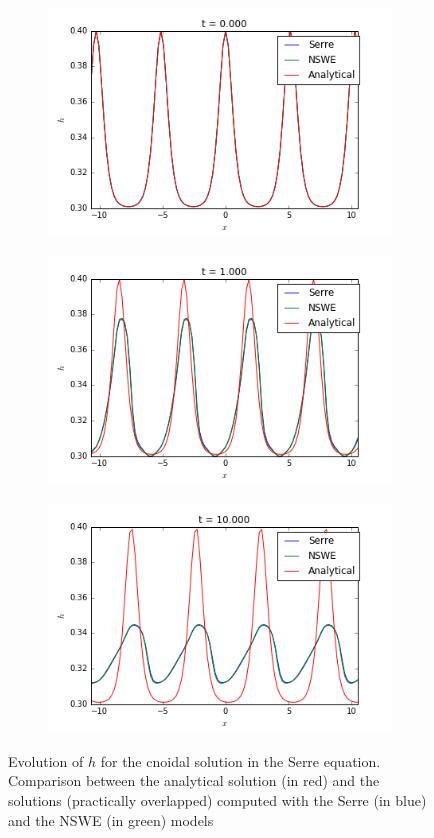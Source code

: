 \begin{figure}[h!]
	\begin{subfigure}{.3\linewidth}
		\includegraphics[scale=.3]{figures/Serre/cnoidal1h.png}	
	\end{subfigure}
	\begin{subfigure}{.3\linewidth}
		\includegraphics[scale=.3]{figures/Serre/cnoidal2h.png}	
	\end{subfigure}
	\begin{subfigure}{.3\linewidth}
		\includegraphics[scale=.3]{figures/Serre/cnoidal3h.png}	
	\end{subfigure}
	\caption{Evolution of $h$ for the cnoidal solution in the Serre equation. Comparison between the analytical solution (in red) and the solutions (practically overlapped) computed with the Serre (in blue) and the NSWE (in green)  models \label{fig:cnoidalhOrdre2}}
\end{figure}


